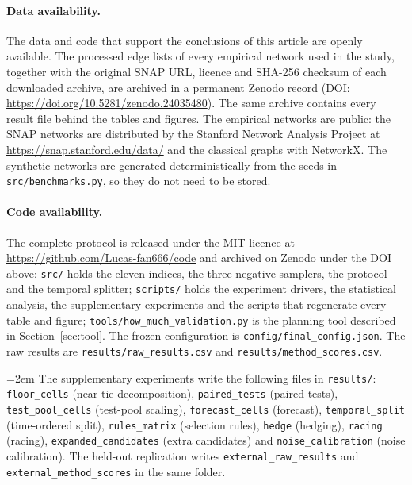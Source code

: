 \documentclass{comjnl}
\begin{document}
\paragraph{Data availability.} The data and code that support the conclusions of this article are openly available. The processed edge lists of every empirical network used in the study, together with the original SNAP URL, licence and SHA-256 checksum of each downloaded archive, are archived in a permanent Zenodo record (DOI: \url{https://doi.org/10.5281/zenodo.24035480}). The same archive contains every result file behind the tables and figures. The empirical networks are public: the SNAP networks are distributed by the Stanford Network Analysis Project at \url{https://snap.stanford.edu/data/} and the classical graphs with NetworkX. The synthetic networks are generated deterministically from the seeds in \texttt{src/benchmarks.py}, so they do not need to be stored.

\paragraph{Code availability.} The complete protocol is released under the MIT licence at \url{https://github.com/Lucas-fan666/code} and archived on Zenodo under the DOI above: \texttt{src/} holds the eleven indices, the three negative samplers, the protocol and the temporal splitter; \texttt{scripts/} holds the experiment drivers, the statistical analysis, the supplementary experiments and the scripts that regenerate every table and figure; \texttt{tools/how\_much\_validation.py} is the planning tool described in Section~\ref{sec:tool}. The frozen configuration is \texttt{config/final\_config.json}. The raw results are \texttt{results/raw\_results.csv} and \texttt{results/method\_scores.csv}.

{\emergencystretch=2em
 
\noindent The supplementary experiments write the following files in \texttt{results/}: \texttt{floor\_cells} (near-tie decomposition), \texttt{paired\_tests} (paired tests), \texttt{test\_pool\_cells} (test-pool scaling), \texttt{forecast\_cells} (forecast), \texttt{temporal\_split} (time-ordered split), \texttt{rules\_matrix} (selection rules), \texttt{hedge} (hedging), \texttt{racing} (racing), \texttt{expanded\_candidates} (extra candidates) and \texttt{noise\_calibration} (noise calibration). The held-out replication writes \texttt{external\_raw\_results} and \texttt{external\_method\_scores} in the same folder.}
\end{document}
